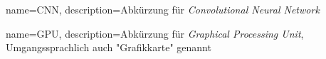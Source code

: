 

{
	name={CNN},
	description={Abkürzung für \emph{Convolutional Neural Network}}
}

{
  name={GPU},
  description={Abkürzung für \emph{Graphical Processing Unit}, Umgangssprachlich auch "Grafikkarte" genannt}
}


